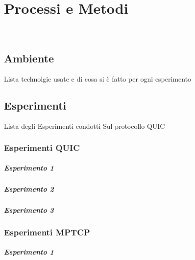 \chapter{Processi e Metodi}
\label{cap:processi-metodologie}

\\

\section{Ambiente}

Lista technolgie usate e di cosa si è fatto per ogni esperimento

\section{Esperimenti}

Lista degli Esperimenti condotti Sul protocollo QUIC
\subsection{Esperimenti QUIC}
\paragraph{Esperimento 1}
\paragraph{Esperimento 2}
\paragraph{Esperimento 3}

\subsection{Esperimenti MPTCP}
\paragraph{Esperimento 1}

